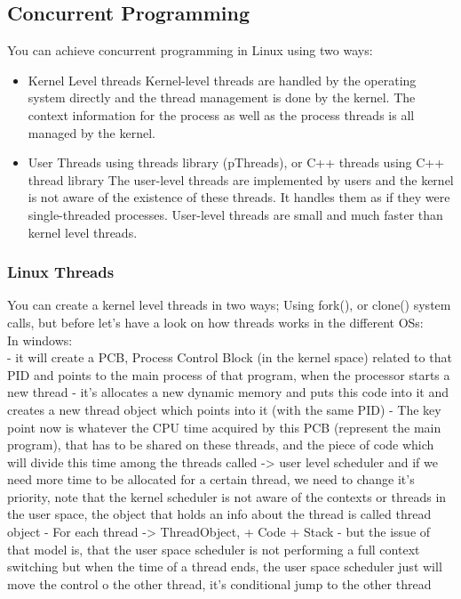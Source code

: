 \documentclass{article}
\begin{document}
\subsection {Concurrent Programming}
You can achieve concurrent programming in Linux using two ways:
\begin{itemize}
    \item Kernel Level threads
    Kernel-level threads are handled by the operating system directly and the thread management is done by the kernel. The context information for the process as well as the process threads is all managed by the kernel.

    \item User Threads using threads library (pThreads), or C++ threads using C++ thread library
    The user-level threads are implemented by users and the kernel is not aware of the existence of these threads. It handles them as if they were single-threaded processes. User-level threads are small and much faster than kernel level threads.
\end{itemize}


\subsubsection {Linux Threads}
You can create a kernel level threads in two ways; Using fork(), or clone() system calls, but before let's have a look on how threads works in the different OSs:\\
In windows:\\
- it will create a PCB, Process Control Block (in the kernel space) related to that PID and points to the main process of that program, when the processor starts a new thread 
- it's allocates a new dynamic memory and puts this code into it and creates a new thread object which points into it (with the same PID)
- The key point now is whatever the CPU time acquired by this PCB (represent the main program), that has to be shared on these threads, and the piece of code which will divide this time among the threads called -> user level scheduler
and if we need more time to be allocated for a certain thread, we need to change it's priority, note that the kernel scheduler is not aware of the contexts or threads in the user space, the object that holds an info about the thread is called thread object
- For each thread -> ThreadObject, + Code + Stack
- but the issue of that model is, that the user space scheduler is not performing a full context switching but when the time of a thread ends, the user space scheduler just will move the control o the other thread, it's conditional jump to the other thread
\end{document}
